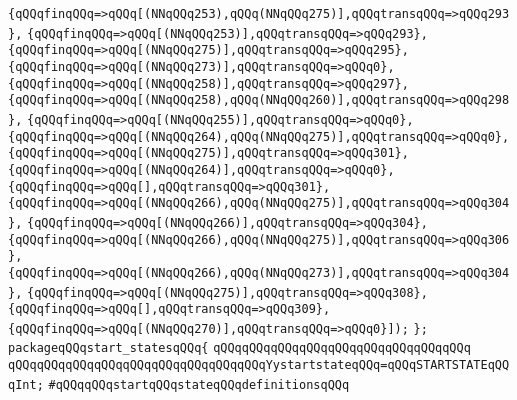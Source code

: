 \verb|{qQQqfinqQQq=>qQQq[(NNqQQq253),qQQq(NNqQQq275)],qQQqtransqQQq=>qQQq293},|\newline
\verb|{qQQqfinqQQq=>qQQq[(NNqQQq253)],qQQqtransqQQq=>qQQq293},|\newline
\verb|{qQQqfinqQQq=>qQQq[(NNqQQq275)],qQQqtransqQQq=>qQQq295},|\newline
\verb|{qQQqfinqQQq=>qQQq[(NNqQQq273)],qQQqtransqQQq=>qQQq0},|\newline
\verb|{qQQqfinqQQq=>qQQq[(NNqQQq258)],qQQqtransqQQq=>qQQq297},|\newline
\verb|{qQQqfinqQQq=>qQQq[(NNqQQq258),qQQq(NNqQQq260)],qQQqtransqQQq=>qQQq298},|\newline
\verb|{qQQqfinqQQq=>qQQq[(NNqQQq255)],qQQqtransqQQq=>qQQq0},|\newline
\verb|{qQQqfinqQQq=>qQQq[(NNqQQq264),qQQq(NNqQQq275)],qQQqtransqQQq=>qQQq0},|\newline
\verb|{qQQqfinqQQq=>qQQq[(NNqQQq275)],qQQqtransqQQq=>qQQq301},|\newline
\verb|{qQQqfinqQQq=>qQQq[(NNqQQq264)],qQQqtransqQQq=>qQQq0},|\newline
\verb|{qQQqfinqQQq=>qQQq[],qQQqtransqQQq=>qQQq301},|\newline
\verb|{qQQqfinqQQq=>qQQq[(NNqQQq266),qQQq(NNqQQq275)],qQQqtransqQQq=>qQQq304},|\newline
\verb|{qQQqfinqQQq=>qQQq[(NNqQQq266)],qQQqtransqQQq=>qQQq304},|\newline
\verb|{qQQqfinqQQq=>qQQq[(NNqQQq266),qQQq(NNqQQq275)],qQQqtransqQQq=>qQQq306},|\newline
\verb|{qQQqfinqQQq=>qQQq[(NNqQQq266),qQQq(NNqQQq273)],qQQqtransqQQq=>qQQq304},|\newline
\verb|{qQQqfinqQQq=>qQQq[(NNqQQq275)],qQQqtransqQQq=>qQQq308},|\newline
\verb|{qQQqfinqQQq=>qQQq[],qQQqtransqQQq=>qQQq309},|\newline
\verb|{qQQqfinqQQq=>qQQq[(NNqQQq270)],qQQqtransqQQq=>qQQq0}]);|\newline
\verb|};|\newline
\verb|packageqQQqstart_statesqQQq{|\newline
\verb|qQQqqQQqqQQqqQQqqQQqqQQqqQQqqQQqqQQq|\newline
\verb|qQQqqQQqqQQqqQQqqQQqqQQqqQQqqQQqqQQqYystartstateqQQq=qQQqSTARTSTATEqQQqInt;|\newline
\newline
\verb|#qQQqqQQqstartqQQqstateqQQqdefinitionsqQQq|\newline
\newline
